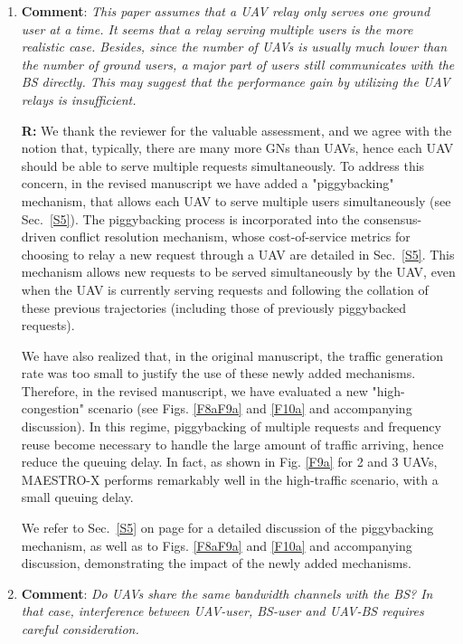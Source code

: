 \documentclass[12pt, draftcls, onecolumn]{IEEEtran}
\theoremstyle{plain}
\theoremstyle{definition}
\theoremstyle{remark}
\begin{document}
\begin{enumerate}
    \item \textbf{Comment}: \emph{This paper assumes that a UAV relay only serves one ground user at a time. It seems that a relay serving multiple users is the more realistic case. Besides, since the number of UAVs is usually much lower than the number of ground users, a major part of users still communicates with the BS directly. This may suggest that the performance gain by utilizing the UAV relays is insufficient.}
    \vspace{2mm}
    
    \textbf{R:} We thank the reviewer for the valuable assessment, and we agree with the notion that, typically, there are many more GNs than UAVs, hence each UAV should be able to serve multiple requests simultaneously. 
    To address this concern, in the revised manuscript we have added a "piggybacking" mechanism,  that allows each UAV to serve multiple users simultaneously (see Sec.~\ref{S5}). The piggybacking process is incorporated into the consensus-driven conflict resolution mechanism, whose cost-of-service metrics for choosing to relay a new request through a UAV are detailed in Sec.~\ref{S5}. This mechanism allows new requests to be served simultaneously by the UAV, even when the UAV is currently serving requests and following the collation of these previous trajectories (including those of previously piggybacked requests).

    We have also realized that, in the original manuscript, the traffic generation rate was too small to justify the use of these newly added mechanisms. Therefore, in the revised manuscript, we have evaluated a new "high-congestion" scenario (see Figs. \ref{F8aF9a} and \ref{F10a} and accompanying discussion). In this regime, piggybacking of multiple requests and frequency reuse become necessary to handle  the large amount of traffic arriving, hence reduce the queuing delay. 
    In fact, as shown in Fig. \ref{F9a} for 2 and 3 UAVs, MAESTRO-X performs remarkably well in the high-traffic scenario, with a small queuing delay.

    We refer to Sec.~\ref{S5} on page \pageref{pb_label} for a detailed discussion of the piggybacking mechanism, as well as to Figs. \ref{F8aF9a} and \ref{F10a} and accompanying discussion, demonstrating the impact of the newly added mechanisms.
    \vspace{2mm}
    
    \item \textbf{Comment}: \emph{Do UAVs share the same bandwidth channels with the BS? In that case, interference between UAV-user, BS-user and UAV-BS requires careful consideration.}
    \vspace{2mm}
    

\end{enumerate}
\end{document}
